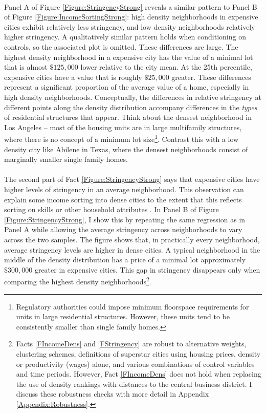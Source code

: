 \documentclass[12pt]{article}
\begin{document}
	\paragraph*{}
	Panel A of Figure \ref{Figure:StringencyStrong} reveals a similar pattern to Panel B of Figure \ref{Figure:IncomeSortingStrong}: high density neighborhoods in expensive cities exhibit relatively less stringency, and low density neighborhoods relatively higher stringency. A qualitatively similar pattern holds when conditioning on controls, so the associated plot is omitted. These differences are large. The highest density neighborhood in a expensive city has the value of a minimal lot that is almost $\$ 125,000$ lower relative to the city mean. At the 25th percentile, expensive cities have a value that is roughly $\$ 25,000$ greater. These differences represent a significant proportion of the average value of a home, especially in high density neighborhoods. Conceptually, the differences in relative stringency at different points along the density distribution accompany differences in the \textit{types} of residential structures that appear. Think about the densest neighborhood in Los Angeles -- most of the housing units are in large multifamily structures, where there is no concept of a minimum lot size\footnote{Regulatory authorities could impose minimum floorspace requirements for units in large residential structures. However, these units tend to be consistently smaller than single family homes.}. Contrast this with a low density city like Abilene in Texas, where the densest neighborhoods consist of marginally smaller single family homes. 
	
	\paragraph*{}
	The second part of Fact \ref{Figure:StringencyStrong} says that expensive cities have higher levels of stringency in an average neighborhood. This observation can explain some income sorting into dense cities to the extent that this reflects sorting on skills or other household attributes \citep{diamond2016, citysizewagegap}. In Panel B of Figure \ref{Figure:StringencyStrong}, I show this by repeating the same regression as in Panel A while allowing the average stringency across neighborhoods to vary across the two samples. The figure shows that, in practically every neighborhood, average stringency levels are higher in dense cities. A typical neighborhood in the middle of the density distribution has a price of a minimal lot approximately $\$300,000$ greater in expensive cities. This gap in stringency disappears only when comparing the highest density neighborhoods\footnote{Facts \ref{FIncomeDens} and \ref{FStringency} are robust to alternative weights, clustering schemes, definitions of superstar cities using housing prices, density or productivity (wages) alone, and various combinations of control variables and time periods. However, Fact \ref{FIncomeDens} does not hold when replacing the use of density rankings with distances to the central business district. I discuss these robustness checks with more detail in Appendix \ref{Appendix:Robustness}.}.
\end{document}
